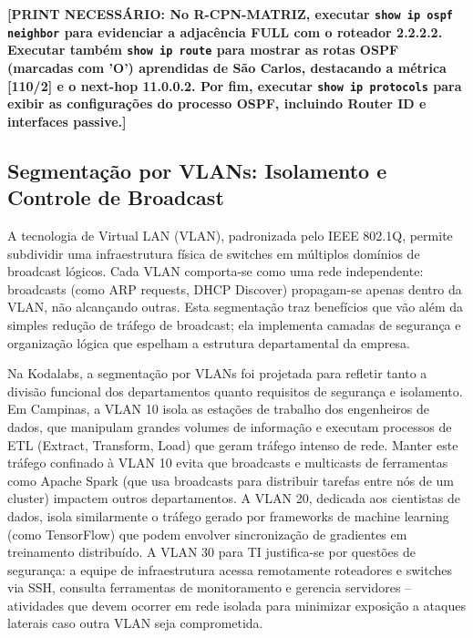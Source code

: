 \documentclass[12pt,a4paper]{article}
\begin{document}
\textbf{[PRINT NECESSÁRIO: No R-CPN-MATRIZ, executar \texttt{show ip ospf neighbor} para evidenciar a adjacência FULL com o roteador 2.2.2.2. Executar também \texttt{show ip route} para mostrar as rotas OSPF (marcadas com 'O') aprendidas de São Carlos, destacando a métrica [110/2] e o next-hop 11.0.0.2. Por fim, executar \texttt{show ip protocols} para exibir as configurações do processo OSPF, incluindo Router ID e interfaces passive.]}

\subsection{Segmentação por VLANs: Isolamento e Controle de Broadcast}

A tecnologia de Virtual LAN (VLAN), padronizada pelo IEEE 802.1Q, permite subdividir uma infraestrutura física de switches em múltiplos domínios de broadcast lógicos. Cada VLAN comporta-se como uma rede independente: broadcasts (como ARP requests, DHCP Discover) propagam-se apenas dentro da VLAN, não alcançando outras. Esta segmentação traz benefícios que vão além da simples redução de tráfego de broadcast; ela implementa camadas de segurança e organização lógica que espelham a estrutura departamental da empresa.

Na Kodalabs, a segmentação por VLANs foi projetada para refletir tanto a divisão funcional dos departamentos quanto requisitos de segurança e isolamento. Em Campinas, a VLAN 10 isola as estações de trabalho dos engenheiros de dados, que manipulam grandes volumes de informação e executam processos de ETL (Extract, Transform, Load) que geram tráfego intenso de rede. Manter este tráfego confinado à VLAN 10 evita que broadcasts e multicasts de ferramentas como Apache Spark (que usa broadcasts para distribuir tarefas entre nós de um cluster) impactem outros departamentos. A VLAN 20, dedicada aos cientistas de dados, isola similarmente o tráfego gerado por frameworks de machine learning (como TensorFlow) que podem envolver sincronização de gradientes em treinamento distribuído. A VLAN 30 para TI justifica-se por questões de segurança: a equipe de infraestrutura acessa remotamente roteadores e switches via SSH, consulta ferramentas de monitoramento e gerencia servidores -- atividades que devem ocorrer em rede isolada para minimizar exposição a ataques laterais caso outra VLAN seja comprometida.
\end{document}
